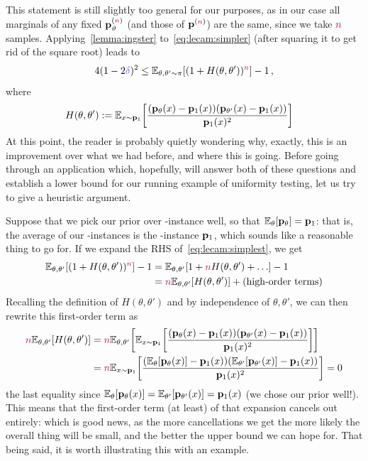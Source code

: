 This statement is still slightly too general for our purposes, as in our case all marginals of any fixed $\mathbf{p}_\vartheta^{({\textcolor{purple}{n}})}$ (and those of $\mathbf{p}^{({\textcolor{purple}{n}})}$) are the same, since we take ${\textcolor{purple}{n}}$ \iid samples. Applying~\cref{lemma:ingster} to~\cref{eq:lecam:simpler} (after squaring it to get rid of the square root) leads to
\begin{equation}
	\label{eq:lecam:simplest}
	4(1-2\errprob)^2 \leq \bE{\theta,\theta'\sim\pi}{(1+{H(\theta,\theta')})^\ns} - 1\,,
\end{equation}
where 
\begin{align}
	\label{eq:lecam:simplest:chi:ip}
H(\theta,\theta') &\eqdef \bE{x\sim\p_\accept}{\frac{(\p_{\theta}(x)-\p_\accept(x))(\p_{\theta'}(x)-\p_\accept(x))}{\p_\accept(x)^2}}
\end{align}
At this point, the reader is probably quietly wondering why, exactly, this is an improvement over what we had before, and where this is going. Before going through an application which, hopefully, will answer both of these questions and establish a lower bound for our running example of uniformity testing, let us try to give a heuristic argument.

Suppose that we pick our prior over \no-instance well, so that $\bE{\theta}{\p_{\theta}}=\p_1$: that is, the average of our \no-instances is the \yes-instance $\mathbf{p}_1$, which sounds like a reasonable thing to go for. If we expand the RHS of~\cref{eq:lecam:simplest}, we get
\begin{align*}
\bE{\theta,\theta'}{(1+{H(\theta,\theta')})^\ns} - 1 
&=\bE{\theta,\theta'}{1+\ns H(\theta,\theta') + \dots } - 1 \\
&= \ns \bE{\theta,\theta'}{H(\theta,\theta')} + \textrm{(high-order terms)}
\end{align*}
Recalling the definition of $H(\theta,\theta')$ and by independence of $\theta,\theta'$, we can then rewrite this first-order term as
\begin{align*}
\ns \bE{\theta,\theta'}{H(\theta,\theta')}
&= \ns \bE{\theta,\theta'}{\bE{x\sim\p_\accept}{\frac{(\p_{\theta}(x)-\p_\accept(x))(\p_{\theta'}(x)-\p_\accept(x))}{\p_\accept(x)^2}}}\\
&=\ns \bE{x\sim\p_\accept}{\frac{(\bE{\theta}{\p_{\theta}(x)}-\p_\accept(x))(\bE{\theta'}{\p_{\theta'}(x)}-\p_\accept(x))}{\p_\accept(x)^2}}
= 0
\end{align*}
the last equality since $\bE{\theta}{\p_{\theta}(x)}=\bE{\theta'}{\p_{\theta'}(x)}=\p_\accept(x)$ (we chose our prior well!). This means that the first-order term (at least) of that expansion cancels out entirely: which is good news, as the more cancellations we get the more likely the overall thing will be small, and the better the upper bound we can hope for. That being said, it is worth illustrating this with an example.


